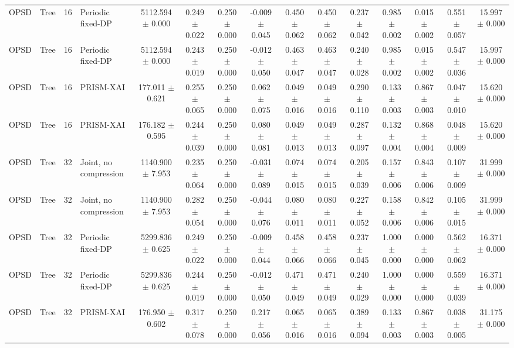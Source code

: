 \begin{tabular}{llllccccccccccc}
OPSD & Tree & 16 & Periodic fixed-DP & 5112.594 $\pm$ 0.000 & 0.249 $\pm$ 0.022 & 0.250 $\pm$ 0.000 & -0.009 $\pm$ 0.045 & 0.450 $\pm$ 0.062 & 0.450 $\pm$ 0.062 & 0.237 $\pm$ 0.042 & 0.985 $\pm$ 0.002 & 0.015 $\pm$ 0.002 & 0.551 $\pm$ 0.057 & 15.997 $\pm$ 0.000 \\
OPSD & Tree & 16 & Periodic fixed-DP & 5112.594 $\pm$ 0.000 & 0.243 $\pm$ 0.019 & 0.250 $\pm$ 0.000 & -0.012 $\pm$ 0.050 & 0.463 $\pm$ 0.047 & 0.463 $\pm$ 0.047 & 0.240 $\pm$ 0.028 & 0.985 $\pm$ 0.002 & 0.015 $\pm$ 0.002 & 0.547 $\pm$ 0.036 & 15.997 $\pm$ 0.000 \\
OPSD & Tree & 16 & PRISM-XAI & 177.011 $\pm$ 0.621 & 0.255 $\pm$ 0.065 & 0.250 $\pm$ 0.000 & 0.062 $\pm$ 0.075 & 0.049 $\pm$ 0.016 & 0.049 $\pm$ 0.016 & 0.290 $\pm$ 0.110 & 0.133 $\pm$ 0.003 & 0.867 $\pm$ 0.003 & 0.047 $\pm$ 0.010 & 15.620 $\pm$ 0.000 \\
OPSD & Tree & 16 & PRISM-XAI & 176.182 $\pm$ 0.595 & 0.244 $\pm$ 0.039 & 0.250 $\pm$ 0.000 & 0.080 $\pm$ 0.081 & 0.049 $\pm$ 0.013 & 0.049 $\pm$ 0.013 & 0.287 $\pm$ 0.097 & 0.132 $\pm$ 0.004 & 0.868 $\pm$ 0.004 & 0.048 $\pm$ 0.009 & 15.620 $\pm$ 0.000 \\
OPSD & Tree & 32 & Joint, no compression & 1140.900 $\pm$ 7.953 & 0.235 $\pm$ 0.064 & 0.250 $\pm$ 0.000 & -0.031 $\pm$ 0.089 & 0.074 $\pm$ 0.015 & 0.074 $\pm$ 0.015 & 0.205 $\pm$ 0.039 & 0.157 $\pm$ 0.006 & 0.843 $\pm$ 0.006 & 0.107 $\pm$ 0.009 & 31.999 $\pm$ 0.000 \\
OPSD & Tree & 32 & Joint, no compression & 1140.900 $\pm$ 7.953 & 0.282 $\pm$ 0.054 & 0.250 $\pm$ 0.000 & -0.044 $\pm$ 0.076 & 0.080 $\pm$ 0.011 & 0.080 $\pm$ 0.011 & 0.227 $\pm$ 0.052 & 0.158 $\pm$ 0.006 & 0.842 $\pm$ 0.006 & 0.105 $\pm$ 0.015 & 31.999 $\pm$ 0.000 \\
OPSD & Tree & 32 & Periodic fixed-DP & 5299.836 $\pm$ 0.625 & 0.249 $\pm$ 0.022 & 0.250 $\pm$ 0.000 & -0.009 $\pm$ 0.044 & 0.458 $\pm$ 0.066 & 0.458 $\pm$ 0.066 & 0.237 $\pm$ 0.045 & 1.000 $\pm$ 0.000 & 0.000 $\pm$ 0.000 & 0.562 $\pm$ 0.062 & 16.371 $\pm$ 0.000 \\
OPSD & Tree & 32 & Periodic fixed-DP & 5299.836 $\pm$ 0.625 & 0.244 $\pm$ 0.019 & 0.250 $\pm$ 0.000 & -0.012 $\pm$ 0.050 & 0.471 $\pm$ 0.049 & 0.471 $\pm$ 0.049 & 0.240 $\pm$ 0.029 & 1.000 $\pm$ 0.000 & 0.000 $\pm$ 0.000 & 0.559 $\pm$ 0.039 & 16.371 $\pm$ 0.000 \\
OPSD & Tree & 32 & PRISM-XAI & 176.950 $\pm$ 0.602 & 0.317 $\pm$ 0.078 & 0.250 $\pm$ 0.000 & 0.217 $\pm$ 0.056 & 0.065 $\pm$ 0.016 & 0.065 $\pm$ 0.016 & 0.389 $\pm$ 0.094 & 0.133 $\pm$ 0.003 & 0.867 $\pm$ 0.003 & 0.038 $\pm$ 0.005 & 31.175 $\pm$ 0.000 \\

\end{tabular}
